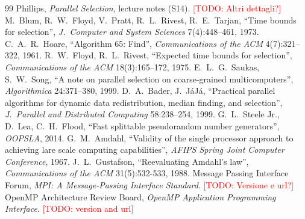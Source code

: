 \documentclass[11pt, titlepage]{article}
\newcommand{\TODO}[1]{\textcolor{red}{[TODO: #1]}}
\begin{document}
\begin{thebibliography}{99}
 Phillips, \emph{Parallel Selection}, lecture notes (S14). \TODO{Altri dettagli?}
 M.~Blum, R.~W.~Floyd, V.~Pratt, R.~L.~Rivest, R.~E.~Tarjan, ``Time bounds for selection'', \emph{J.\ Computer and System Sciences} 7(4):448--461, 1973.
 C.~A.~R.~Hoare, ``Algorithm 65: Find'', \emph{Communications of the ACM} 4(7):321--322, 1961.
 R.~W.~Floyd, R.~L.~Rivest, ``Expected time bounds for selection'', \emph{Communications of the ACM} 18(3):165--172, 1975.
 E.~L.~G.~Saukas, S.~W.~Song, ``A note on parallel selection on coarse-grained multicomputers'', \emph{Algorithmica} 24:371--380, 1999.
 D.~A.~Bader, J.~J\'aJ\'a, ``Practical parallel algorithms for dynamic data redistribution, median finding, and selection'', \emph{J.\ Parallel and Distributed Computing} 58:238--254, 1999.
 G.~L.~Steele Jr., D.~Lea, C.~H.~Flood, ``Fast splittable pseudorandom number generators'', \emph{OOPSLA}, 2014.
 G.~M.~Amdahl, ``Validity of the single processor approach to achieving lare scale computing capabilities'', \emph{AFIPS Spring Joint Computer Conference}, 1967.
 J.~L.~Gustafson, ``Reevaluating Amdahl's law'', \emph{Communications of the ACM} 31(5):532-533, 1988.
 Message Passing Interface Forum, \emph{MPI: A Message-Passing Interface Standard}. \TODO{Versione e url?}
 OpenMP Architecture Review Board, \emph{OpenMP Application Programming Interface}. \TODO{version and url}
\end{thebibliography}
\end{document}
